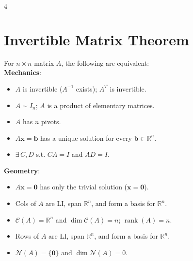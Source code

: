 \documentclass[9pt]{extarticle}
\begin{document}
\begin{multicols*}{4}

\section*{Invertible Matrix Theorem}
For $n \times n$ matrix $A$, the following are equivalent:\\
\textbf{Mechanics}:
\begin{itemize}[leftmargin=*, nosep]
    \item $A$ is invertible ($A^{-1}$ exists); $A^T$ is invertible.
    \item $A \sim I_{n}$; $A$ is a product of elementary matrices.
    \item $A$ has $n$ pivots.
    \item $A\mathbf{x}=\mathbf{b}$ has a unique solution for every $\mathbf{b}\in\mathbb{R}^{n}$.
    \item $\exists\, C, D$ s.t. $CA=I$ and $AD=I$.
\end{itemize}
\textbf{Geometry}:
\begin{itemize}[leftmargin=*, nosep]
    \item $A\mathbf{x}=\mathbf{0}$ has only the trivial solution ($\mathbf{x}=\mathbf{0}$).
    \item Cols of $A$ are LI, span $\mathbb{R}^{n}$, and form a basis for $\mathbb{R}^{n}$.
    \item $\mathcal{C}(A)=\mathbb{R}^{n}$ and $\operatorname{dim}\mathcal{C}(A)=n$; $\operatorname{rank}(A)=n$.
    \item Rows of $A$ are LI, span $\mathbb{R}^n$, and form a basis for $\mathbb{R}^n$.
    \item $\mathcal{N}(A)=\{\mathbf{0}\}$ and $\operatorname{dim}\mathcal{N}(A)=0$.
\end{itemize}

\end{multicols*}
\end{document}
